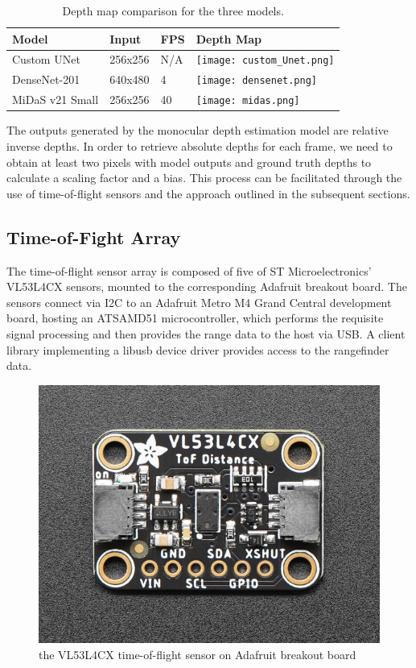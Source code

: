 \documentclass[conference]{IEEEtran}
\begin{document}
\begin{table}[htbp]
\centering
\caption{Depth map comparison for the three models.}
\label{tab:model_comparison}
\small %
\begin{tabular}{|p{1.4cm}|p{1.2cm}|p{1cm}| p{2.5cm}|}
\hline
\textbf{Model} & \textbf{Input} & \textbf{FPS} & \textbf{Depth Map} \\
\hline
Custom UNet & 256x256 & N/A &  \texttt{[image: custom\_Unet.png]} \\ \hline
DenseNet-201 & 640x480 & 4  & \texttt{[image: densenet.png]} \\ \hline
MiDaS v21 Small & 256x256 & 40  & \texttt{[image: midas.png]} \\ \hline
\end{tabular}
\end{table}


The outputs generated by the monocular depth estimation model are relative inverse depths. In order to retrieve absolute depths for each frame, we need to obtain at least two pixels with model outputs and ground truth depths to calculate a scaling factor and a bias. This process can be facilitated through the use of time-of-flight sensors and the approach outlined in the subsequent sections.
\FloatBarrier
\subsection{Time-of-Fight Array}
The time-of-flight sensor array is composed of five of ST Microelectronics'
VL53L4CX sensors, mounted to the corresponding Adafruit breakout board. The
sensors connect via I2C to an Adafruit Metro M4 Grand Central development
board, hosting an ATSAMD51 microcontroller, which performs the requisite signal
processing and then provides the range data to the host via USB. A client
library implementing a libusb device driver provides access to the rangefinder
data.

\begin{figure}
\centering
\includegraphics[scale=0.31]{vl53l4cx-adafruit.png}
\caption{the VL53L4CX time-of-flight sensor on Adafruit breakout board}
\label{fig:vl53l4cx}
\end{figure}
\end{document}
